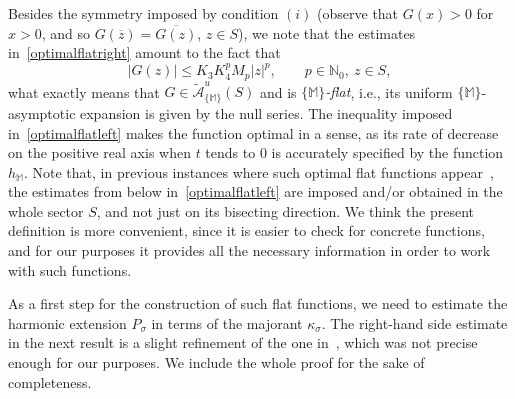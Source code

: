 \documentclass[11pt,a4paper]{article}
\theoremstyle{plain}
\theoremstyle{definition}
\newcommand{\N}{\mathbb{N}}
\newcommand{\ka}{\kappa}
\newcommand{\M}{\mathbb{M}}
\begin{document}
Besides the symmetry imposed by condition $(i)$ (observe that $G(x)>0$ for $x>0$, and so $G(\overline{z})=\overline{G(z)}$, $z\in S$),
we note that the estimates in~\eqref{optimalflatright} amount to the fact that
$$|G(z)|\le K_3K_4^pM_p|z|^p,\qquad p\in\N_0,\ z\in S,
$$
what exactly means that $G\in\widetilde{\mathcal{A}}^u_{\{\M\}}(S)$ and is \emph{$\{\M\}$-flat}, i.e., its uniform $\{\M\}$-asymptotic expansion is given by the null series. The inequality imposed in~\eqref{optimalflatleft} makes the function optimal in a sense, as its rate of decrease on the positive real axis when $t$ tends to 0 is accurately specified by the function $h_{\M}$.
Note that, in previous instances where such optimal flat functions appear~\cite{Thilliez03,LastraMalekSanzContinuousRightLaplace,JimenezLastraSanzRapidGrowth}, the estimates from below in~\eqref{optimalflatleft} are imposed and/or obtained in the whole sector $S$, and not just on its bisecting direction. We think the present definition is more convenient, since it is easier to check for concrete functions, and for our purposes it provides all the necessary information in order to work with such functions.


As a first step for the construction of such flat functions, we need to estimate the harmonic extension $P_\sigma$ in terms of the majorant $\ka_\sigma$. The right-hand side estimate in the next result is a slight refinement of the one in~\cite[Lemma\ 3.3]{BonetMeiseTaylor92}, which was not precise enough for our purposes. We include the whole proof for the sake of completeness.
\end{document}

